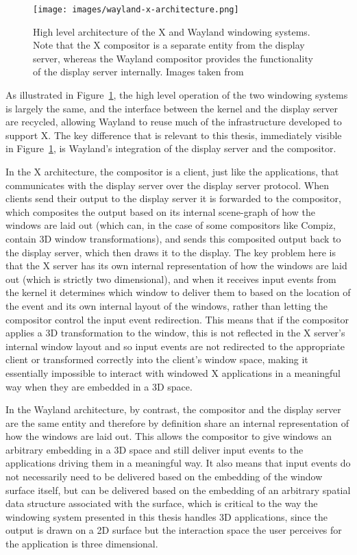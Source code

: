 \begin{figure}[ht!]
\centering
\texttt{[image: images/wayland-x-architecture.png]}
\caption{High level architecture of the X and Wayland windowing systems. Note that the X compositor is a separate entity from the display server, whereas the Wayland compositor provides the functionality of the display server internally. Images taken from  \protect\cite{wayland}}
\label{fig:wayland-vs-x}
\end{figure}



As illustrated in Figure~\ref{fig:wayland-vs-x}, the high level operation of the two windowing systems is largely the same, and the interface between the kernel and the display server are recycled, allowing Wayland to reuse much of the infrastructure developed to support X. The key difference that is relevant to this thesis, immediately visible in Figure~\ref{fig:wayland-vs-x}, is Wayland's integration of the display server and the compositor. 

In the X architecture, the compositor is a client, just like the applications, that communicates with the display server over the display server protocol. When clients send their output to the display server it is forwarded to the compositor, which composites the output based on its internal scene-graph of how the windows are laid out (which can, in the case of some compositors like Compiz, contain 3D window transformations), and sends this composited output back to the display server, which then draws it to the display. The key problem here is that the X server has its own internal representation of how the windows are laid out (which is strictly two dimensional), and when it receives input events from the kernel it  determines which window to deliver them to based on the location of the event and its own internal layout of the windows, rather than letting the compositor control the input event redirection. This means that if the compositor applies a 3D transformation to the window, this is not reflected in the X server's internal window layout and so input events are not redirected to the appropriate client or transformed correctly into the client's window space, making it essentially impossible to interact with windowed X applications in a meaningful way when they are embedded in a 3D space. 

In the Wayland architecture, by contrast, the compositor and the display server are the same entity and therefore by definition share an internal representation of how the windows are laid out. This allows the compositor to give windows an arbitrary embedding in a 3D space and still deliver input events to the applications driving them in a meaningful way. It also means that input events do not necessarily need to be delivered based on the embedding of the window surface itself, but can be delivered based on the embedding of an arbitrary spatial data structure associated with the surface, which is critical to the way the windowing system presented in this thesis handles 3D applications, since the output is drawn on a 2D surface but the interaction space the user perceives for the application is three dimensional.


